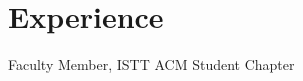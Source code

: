 \documentclass[]{deedy-resume-openfont}
\begin{document}
\begin{minipage}[t]{0.66\textwidth} 
	
	
\section{Experience}

\vspace{\topsep} %
\begin{tightemize}
	\item Faculty Member, ISTT ACM Student Chapter
\end{tightemize}
\sectionsep	


%
%
%
%




\end{minipage}
\end{document}
